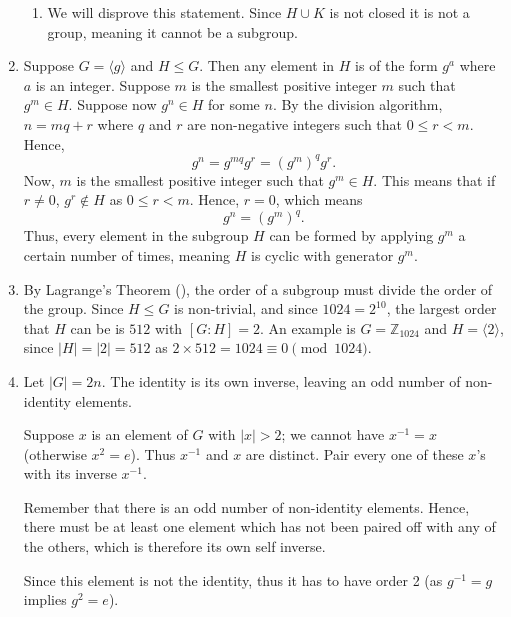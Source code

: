\begin{enumerate}
\begin{enumerate}[label=(\alph*)]
        \item We will disprove this statement. Since $H \cup K$ is not closed it is not a group, meaning it cannot be a subgroup.
    \end{enumerate}

    \item Suppose $G = \langle g \rangle$ and $H \leq G$. Then any element in $H$ is of the form $g^a$ where $a$ is an integer. Suppose $m$ is the smallest positive integer $m$ such that $g^m \in H$. Suppose now $g^n \in H$ for some $n$. By the division algorithm, $n = mq + r$ where $q$ and $r$ are non-negative integers such that $0 \leq r < m$. Hence,
    \[
        g^n = g^{mq}g^r = (g^m)^q g^r.
    \]
    Now, $m$ is the smallest positive integer such that $g^m \in H$. This means that if $r \neq 0$, $g^r \not\in H$ as $0 \leq r < m$. Hence, $r = 0$, which means
    \[
        g^n = (g^m)^q.
    \]
    Thus, every element in the subgroup $H$ can be formed by applying $g^m$ a certain number of times, meaning $H$ is cyclic with generator $g^m$.

    \item By Lagrange's Theorem (), the order of a subgroup must divide the order of the group. Since $H \leq G$ is non-trivial, and since $1024 = 2^{10}$, the largest order that $H$ can be is $512$ with $[G:H] = 2$. An example is $G = \mathbb{Z}_{1024}$ and $H = \langle 2 \rangle$, since $|H| = |2| = 512$ as $2 \times 512 = 1024 \equiv 0 \pmod{1024}$.

    \item Let $|G| = 2n$. The identity is its own inverse, leaving an odd number of non-identity elements.
    
    Suppose $x$ is an element of $G$ with $|x| > 2$; we cannot have $x^{-1} = x$ (otherwise $x^2 = e$). Thus $x^{-1}$ and $x$ are distinct. Pair every one of these $x$'s with its inverse $x^{-1}$.

    Remember that there is an odd number of non-identity elements. Hence, there must be at least one element which has not been paired off with any of the others, which is therefore its own self inverse.

    Since this element is not the identity, thus it has to have order 2 (as $g^{-1} = g$ implies $g^2 = e$).


\end{enumerate}
